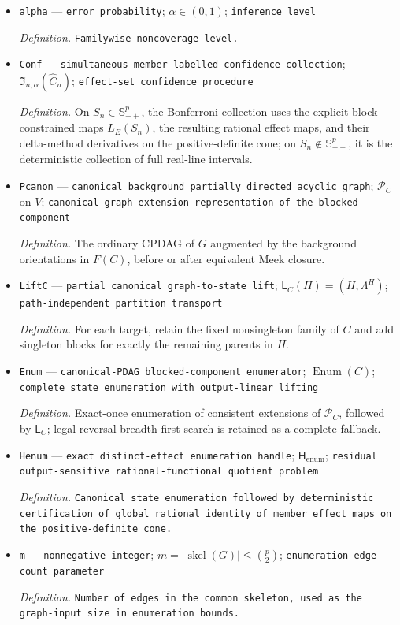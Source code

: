 \documentclass{article}
\begin{document}
\begin{itemize}
  \item \texttt{alpha} --- \texttt{error probability}; \(\alpha\in(0,1)\); \texttt{inference level}
  \par\smallskip\noindent\emph{Definition.} \texttt{Familywise noncoverage level.}
  \item \texttt{Conf} --- \texttt{simultaneous member-\allowbreak{}labelled confidence collection}; \(\mathfrak I_{n,\alpha}(\widehat C_n)\); \texttt{effect-\allowbreak{}set confidence procedure}
  \par\smallskip\noindent\emph{Definition.} On \(S_n\in\mathbb S^p_{++}\), the Bonferroni collection uses the explicit block-constrained maps \(L_E(S_n)\), the resulting rational effect maps, and their delta-method derivatives on the positive-definite cone; on \(S_n\notin\mathbb S^p_{++}\), it is the deterministic collection of full real-line intervals.
  \item \texttt{Pcanon} --- \texttt{canonical background partially directed acyclic graph}; \(\mathcal P_C\) on \(V\); \texttt{canonical graph-\allowbreak{}extension representation of the blocked component}
  \par\smallskip\noindent\emph{Definition.} The ordinary CPDAG of \(G\) augmented by the background orientations in \(F(C)\), before or after equivalent Meek closure.
  \item \texttt{LiftC} --- \texttt{partial canonical graph-\allowbreak{}to-\allowbreak{}state lift}; \(\mathsf L_C(H)=(H,\Lambda^H)\); \texttt{path-\allowbreak{}independent partition transport}
  \par\smallskip\noindent\emph{Definition.} For each target, retain the fixed nonsingleton family of \(C\) and add singleton blocks for exactly the remaining parents in \(H\).
  \item \texttt{Enum} --- \texttt{canonical-\allowbreak{}PDAG blocked-\allowbreak{}component enumerator}; \(\operatorname{Enum}(C)\); \texttt{complete state enumeration with output-\allowbreak{}linear lifting}
  \par\smallskip\noindent\emph{Definition.} Exact-once enumeration of consistent extensions of \(\mathcal P_C\), followed by \(\mathsf L_C\); legal-reversal breadth-first search is retained as a complete fallback.
  \item \texttt{Henum} --- \texttt{exact distinct-\allowbreak{}effect enumeration handle}; \(\mathsf H_{\mathrm{enum}}\); \texttt{residual output-\allowbreak{}sensitive rational-\allowbreak{}functional quotient problem}
  \par\smallskip\noindent\emph{Definition.} \texttt{Canonical state enumeration followed by deterministic certification of global rational identity of member effect maps on the positive-\allowbreak{}definite cone.}
  \item \texttt{m} --- \texttt{nonnegative integer}; \(m=|\operatorname{skel}(G)|\leq\binom{p}{2}\); \texttt{enumeration edge-\allowbreak{}count parameter}
  \par\smallskip\noindent\emph{Definition.} \texttt{Number of edges in the common skeleton,\allowbreak{} used as the graph-\allowbreak{}input size in enumeration bounds.}
\end{itemize}
\end{document}

